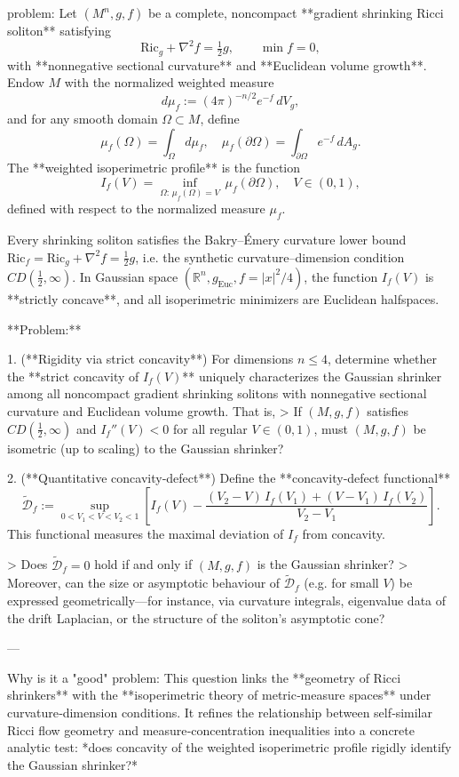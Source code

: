 problem:  
Let \((M^n,g,f)\) be a complete, noncompact **gradient shrinking Ricci soliton** satisfying  
\[
\mathrm{Ric}_g + \nabla^2 f = \tfrac{1}{2} g, \qquad \min f = 0,
\]
with **nonnegative sectional curvature** and **Euclidean volume growth**.  
Endow \(M\) with the normalized weighted measure  
\[
d\mu_f := (4\pi)^{-n/2} e^{-f}\, dV_g,
\]
and for any smooth domain \(\Omega \subset M\), define  
\[
\mu_f(\Omega) = \int_\Omega d\mu_f, \quad 
\mu_f(\partial \Omega) = \int_{\partial \Omega} e^{-f} \, dA_g.
\]
The **weighted isoperimetric profile** is the function
\[
I_f(V) = \inf_{\Omega:\, \mu_f(\Omega) = V}\, \mu_f(\partial \Omega), \quad V \in (0,1),
\]
defined with respect to the normalized measure \(\mu_f\).

Every shrinking soliton satisfies the Bakry–Émery curvature lower bound \(\mathrm{Ric}_f = \mathrm{Ric}_g + \nabla^2 f = \tfrac{1}{2} g\), i.e. the synthetic curvature–dimension condition \(CD(\tfrac{1}{2},\infty)\).  
In Gaussian space \((\mathbb{R}^n,g_{\mathrm{Euc}},f=|x|^2/4)\), the function \(I_f(V)\) is **strictly concave**, and all isoperimetric minimizers are Euclidean halfspaces.

**Problem:**  

1. (**Rigidity via strict concavity**)  
For dimensions \(n\le4\), determine whether the **strict concavity of \(I_f(V)\)** uniquely characterizes the Gaussian shrinker among all noncompact gradient shrinking solitons with nonnegative sectional curvature and Euclidean volume growth.  
That is,  
> If \((M,g,f)\) satisfies \(CD(\tfrac{1}{2},\infty)\) and \(I_f''(V)<0\) for all regular \(V \in (0,1)\), must \((M,g,f)\) be isometric (up to scaling) to the Gaussian shrinker?

2. (**Quantitative concavity‑defect**)  
Define the **concavity‑defect functional**
\[
\tilde{\mathcal D}_f := 
\sup_{0<V_1<V<V_2<1}
\left[
I_f(V) - 
\frac{(V_2-V)\, I_f(V_1) + (V-V_1)\, I_f(V_2)}{V_2 - V_1}
\right].
\]
This functional measures the maximal deviation of \(I_f\) from concavity.  

> Does \(\tilde{\mathcal D}_f = 0\) hold if and only if \((M,g,f)\) is the Gaussian shrinker?  
> Moreover, can the size or asymptotic behaviour of \(\tilde{\mathcal D}_f\) (e.g. for small \(V\)) be expressed geometrically—for instance, via curvature integrals, eigenvalue data of the drift Laplacian, or the structure of the soliton's asymptotic cone?

---

Why is it a "good" problem:  
This question links the **geometry of Ricci shrinkers** with the **isoperimetric theory of metric‑measure spaces** under curvature‑dimension conditions. It refines the relationship between self‑similar Ricci flow geometry and measure‑concentration inequalities into a concrete analytic test: *does concavity of the weighted isoperimetric profile rigidly identify the Gaussian shrinker?*

